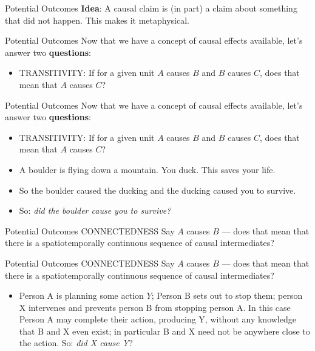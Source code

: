 \documentclass[
  11pt,
  ignorenonframetext,
]{beamer}
\providecommand{\tightlist}{%
  \setlength{\itemsep}{0pt}\setlength{\parskip}{0pt}}\usepackage{longtable,booktabs,array}
\begin{document}
\begin{frame}{Potential Outcomes}
\protect\hypertarget{potential-outcomes-1}{}
\textbf{Idea}: A causal claim is (in part) a claim about something that
did not happen. This makes it metaphysical.
\end{frame}

\begin{frame}{Potential Outcomes}
\protect\hypertarget{potential-outcomes-2}{}
Now that we have a concept of causal effects available, let's answer two
\textbf{questions}:

\begin{itemize}
\tightlist
\item
  TRANSITIVITY: If for a given unit \(A\) causes \(B\) and \(B\) causes
  \(C\), does that mean that \(A\) causes \(C\)?
\end{itemize}
\end{frame}

\begin{frame}{Potential Outcomes}
\protect\hypertarget{potential-outcomes-3}{}
Now that we have a concept of causal effects available, let's answer two
\textbf{questions}:

\begin{itemize}
\item
  TRANSITIVITY: If for a given unit \(A\) causes \(B\) and \(B\) causes
  \(C\), does that mean that \(A\) causes \(C\)?
\item
  A boulder is flying down a mountain. You duck. This saves your life.
\item
  So the boulder caused the ducking and the ducking caused you to
  survive.
\item
  So: \emph{did the boulder cause you to survive?}
\end{itemize}
\end{frame}

\begin{frame}{Potential Outcomes}
\protect\hypertarget{potential-outcomes-4}{}
CONNECTEDNESS Say \(A\) causes \(B\) --- does that mean that there is a
spatiotemporally continuous sequence of causal intermediates?
\end{frame}

\begin{frame}{Potential Outcomes}
\protect\hypertarget{potential-outcomes-5}{}
CONNECTEDNESS Say \(A\) causes \(B\) --- does that mean that there is a
spatiotemporally continuous sequence of causal intermediates?

\begin{itemize}
\tightlist
\item
  Person A is planning some action \(Y\); Person B sets out to stop
  them; person X intervenes and prevents person B from stopping person
  A. In this case Person A may complete their action, producing Y,
  without any knowledge that B and X even exist; in particular B and X
  need not be anywhere close to the action. So: \emph{did X cause Y}?
\end{itemize}
\end{frame}
\end{document}
